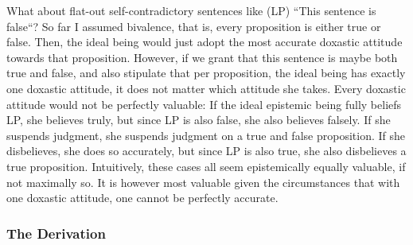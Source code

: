 \documentclass[12pt,numbers=noenddot]{scrartcl}
\begin{document}
What about flat-out self-contradictory sentences like (LP) “This sentence is false“? So far I assumed bivalence, that is, every proposition is either true or false. Then, the ideal being would just adopt the most accurate doxastic attitude towards that proposition. However, if we grant that this sentence is maybe both true and false, and also stipulate that per proposition, the ideal being has exactly one doxastic attitude, it does not matter which attitude she takes. Every doxastic attitude would not be perfectly valuable: If the ideal epistemic being fully beliefs LP, she believes truly, but since LP is also false, she also believes falsely. If she suspends judgment, she suspends judgment on a true and false proposition. If she disbelieves, she does so accurately, but since LP is also true, she also disbelieves a true proposition. Intuitively, these cases all seem epistemically equally valuable, if not maximally so. It is however most valuable given the circumstances that with one doxastic attitude, one cannot be perfectly accurate.

\subsubsection{The Derivation}
\end{document}
